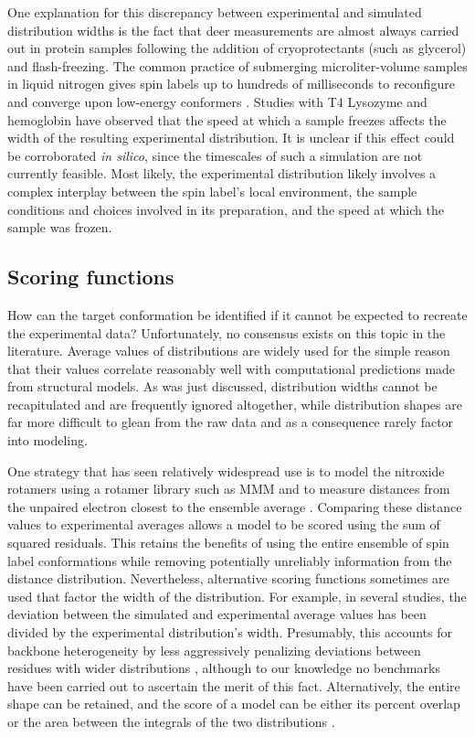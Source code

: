 One explanation for this discrepancy between experimental and simulated distribution widths is the fact that \gls{deer} measurements are almost always carried out in protein samples following the addition of cryoprotectants (such as glycerol) and flash-freezing. The common practice of submerging microliter-volume samples in liquid nitrogen gives spin labels up to hundreds of milliseconds to reconfigure and converge upon low-energy conformers \citep*{Schmidt2020}. Studies with T4 Lysozyme \citep*{Georgieva2012} and hemoglobin \citep*{Banham2007} have observed that the speed at which a sample freezes affects the width of the resulting experimental distribution. It is unclear if this effect could be corroborated \emph{in silico}, since the timescales of such a simulation are not currently feasible. Most likely, the experimental distribution likely involves a complex interplay between the spin label's local environment, the sample conditions and choices involved in its preparation, and the speed at which the sample was frozen.

\subsection{Scoring functions}\label{sec:deerintro_scoring_fxns}

How can the target conformation be identified if it cannot be expected to recreate the experimental data? Unfortunately, no consensus exists on this topic in the literature. Average values of distributions are widely used for the simple reason that their values correlate reasonably well with computational predictions made from structural models. As was just discussed, distribution widths cannot be recapitulated and are frequently ignored altogether, while distribution shapes are far more difficult to glean from the raw data and as a consequence rarely factor into modeling.

One strategy that has seen relatively widespread use is to model the nitroxide rotamers using a rotamer library such as MMM and to measure distances from the unpaired electron closest to the ensemble average \citep*{Dastvan2016, Duss2014, Duss2015, Duss2014a, Fehr2015, Raba2014, Ward2009}. Comparing these distance values to experimental averages allows a model to be scored using the sum of squared residuals. This retains the benefits of using the entire ensemble of spin label conformations while removing potentially unreliably information from the distance distribution. Nevertheless, alternative scoring functions sometimes are used that factor the width of the distribution. For example, in several studies, the deviation between the simulated and experimental average values has been divided by the experimental distribution's width. Presumably, this accounts for backbone heterogeneity by less aggressively penalizing deviations between residues with wider distributions \citep*{Jeschke2016, Peter2019}, although to our knowledge no benchmarks have been carried out to ascertain the merit of this fact. Alternatively, the entire shape can be retained, and the score of a model can be either its percent overlap \citep*{Hays2019, Jeschke2020, Kazmier2014a, Raghuraman2014} or the area between the integrals of the two distributions \citep*{Krug2016}.

